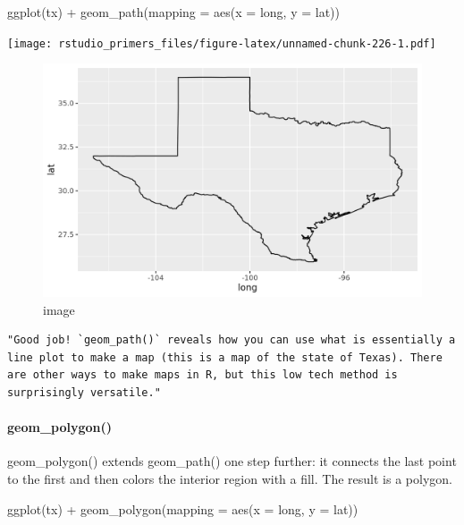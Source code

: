 \documentclass[
]{article}
\newenvironment{Shaded}{\begin{snugshade}}{\end{snugshade}}
\newcommand{\AttributeTok}[1]{\textcolor[rgb]{0.77,0.63,0.00}{#1}}
\newcommand{\FunctionTok}[1]{\textcolor[rgb]{0.00,0.00,0.00}{#1}}
\newcommand{\NormalTok}[1]{#1}
\newcommand{\SpecialCharTok}[1]{\textcolor[rgb]{0.00,0.00,0.00}{#1}}
\begin{document}
\begin{Shaded}
\begin{Highlighting}[]
\FunctionTok{ggplot}\NormalTok{(tx) }\SpecialCharTok{+}
  \FunctionTok{geom\_path}\NormalTok{(}\AttributeTok{mapping =} \FunctionTok{aes}\NormalTok{(}\AttributeTok{x =}\NormalTok{ long, }\AttributeTok{y =}\NormalTok{ lat))}
\end{Highlighting}
\end{Shaded}

\texttt{[image: rstudio\_primers\_files/figure-latex/unnamed-chunk-226-1.pdf]}

\begin{figure}
\centering
\includegraphics{data/mapoftexas.png}
\caption{image}
\end{figure}

\begin{verbatim}
"Good job! `geom_path()` reveals how you can use what is essentially a line plot to make a map (this is a map of the state of Texas). There are other ways to make maps in R, but this low tech method is surprisingly versatile."
\end{verbatim}

\hypertarget{geom_polygon}{%
\paragraph{geom\_polygon()}\label{geom_polygon}}

geom\_polygon() extends geom\_path() one step further: it connects the
last point to the first and then colors the interior region with a fill.
The result is a polygon.

\begin{Shaded}
\begin{Highlighting}[]
\FunctionTok{ggplot}\NormalTok{(tx) }\SpecialCharTok{+}
  \FunctionTok{geom\_polygon}\NormalTok{(}\AttributeTok{mapping =} \FunctionTok{aes}\NormalTok{(}\AttributeTok{x =}\NormalTok{ long, }\AttributeTok{y =}\NormalTok{ lat))}
\end{Highlighting}
\end{Shaded}
\end{document}
